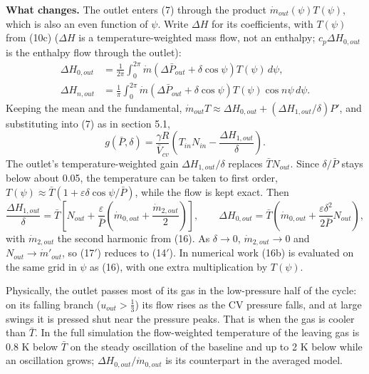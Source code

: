 \documentclass[11pt]{article}
\begin{document}
\textbf{What changes.} The outlet enters (7) through the product $\dot m_{out}(\psi)T(\psi)$, which is also an even function of $\psi$. Write $\Delta H$ for its coefficients, with $T(\psi)$ from (10c) ($\Delta H$ is a temperature-weighted mass flow, not an enthalpy; $c_p\Delta H_{0,out}$ is the enthalpy flow through the outlet):
\begin{equation}
\begin{aligned}
\Delta H_{0,out} &= \frac{1}{2\pi}\int_0^{2\pi}\dot m\left(\Delta\bar P_{out} + \delta\cos\psi\right)T(\psi)\,d\psi, \\
\Delta H_{n,out} &= \frac{1}{\pi}\int_0^{2\pi}\dot m\left(\Delta\bar P_{out} + \delta\cos\psi\right)T(\psi)\cos n\psi\,d\psi .
\end{aligned} \tag{16b}
\end{equation}
Keeping the mean and the fundamental, $\dot m_{out}T \approx \Delta H_{0,out} + (\Delta H_{1,out}/\delta)P'$, and substituting into (7) as in section 5.1,
\begin{equation}
g(\bar P,\delta) = \frac{\gamma R}{\bar V_{cv}}\left(T_{in}N_{in} - \frac{\Delta H_{1,out}}{\delta}\right) . \tag{17$'$}
\end{equation}
The outlet's temperature-weighted gain $\Delta H_{1,out}/\delta$ replaces $\bar TN_{out}$. Since $\delta/\bar P$ stays below about 0.05, the temperature can be taken to first order, $T(\psi) \approx \bar T(1 + \varepsilon\delta\cos\psi/\bar P)$, while the flow is kept exact. Then
\begin{equation}
\frac{\Delta H_{1,out}}{\delta} = \bar T\left[N_{out} + \frac{\varepsilon}{\bar P}\left(\dot m_{0,out} + \frac{\dot m_{2,out}}{2}\right)\right], \qquad
\Delta H_{0,out} = \bar T\left(\dot m_{0,out} + \frac{\varepsilon\delta^2}{2\bar P}N_{out}\right) , \tag{17d}
\end{equation}
with $\dot m_{2,out}$ the second harmonic from (16). As $\delta \to 0$, $\dot m_{2,out} \to 0$ and $N_{out} \to \dot m'_{out}$, so (17$'$) reduces to (14$'$). In numerical work (16b) is evaluated on the same grid in $\psi$ as (16), with one extra multiplication by $T(\psi)$.

Physically, the outlet passes most of its gas in the low-pressure half of the cycle: on its falling branch ($u_{out} > \tfrac13$) its flow rises as the CV pressure falls, and at large swings it is pressed shut near the pressure peaks. That is when the gas is cooler than $\bar T$. In the full simulation the flow-weighted temperature of the leaving gas is 0.8 K below $\bar T$ on the steady oscillation of the baseline and up to 2 K below while an oscillation grows; $\Delta H_{0,out}/\dot m_{0,out}$ is its counterpart in the averaged model.
\end{document}
